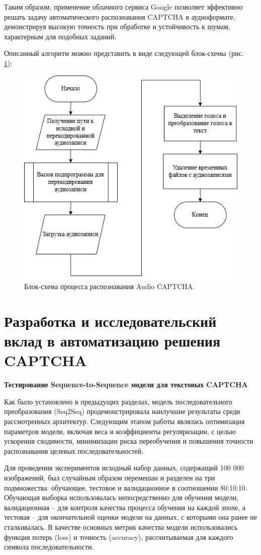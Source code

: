 Таким образом, применение облачного сервиса Google позволяет эффективно решать 
задачу автоматического распознавания CAPTCHA в аудиоформате, демонстрируя высокую 
точность при обработке и устойчивость к шумам, характерным для подобных заданий.

Описанный алгоритм можно представить в виде следующей блок-схемы (рис.~
\ref{fig:recognize-audio}):

\begin{figure}[H]
    \centering
    \includegraphics[width=0.6\linewidth]{
        imgs/audiocaptcha/recognize_audiocaptcha.png
    }
    \caption{Блок-схема процесса распознавания Audio CAPTCHA.}
    \label{fig:recognize-audio}
\end{figure}

\section{Разработка и исследовательский вклад в автоматизацию решения CAPTCHA}

\textbf{Тестирование Sequence-to-Sequence модели для текстовых CAPTCHA}

Как было установлено в предыдущих разделах, модель последовательного 
преобразования (Seq2Seq) продемонстрировала наилучшие результаты среди 
рассмотренных архитектур. Следующим этапом работы являлась оптимизация параметров 
модели, включая веса и коэффициенты регуляризации, с целью ускорения сходимости, 
минимизации риска переобучения и повышения точности распознавания целевых 
последовательностей.

Для проведения экспериментов исходный набор данных, содержащий 100 000 
изображений, был случайным образом перемешан и разделен на три подмножества: 
обучающее, тестовое и валидационное в соотношении 80:10:10. Обучающая выборка 
использовалась непосредственно для обучения модели, валидационная -- для контроля 
качества процесса обучения на каждой эпохе, а тестовая -- для окончательной 
оценки модели на данных, с которыми она ранее не сталкивалась. В качестве 
основных метрик качества модели использовались функция потерь (loss) и точность 
(accuracy), рассчитываемая для каждого символа последовательности.

